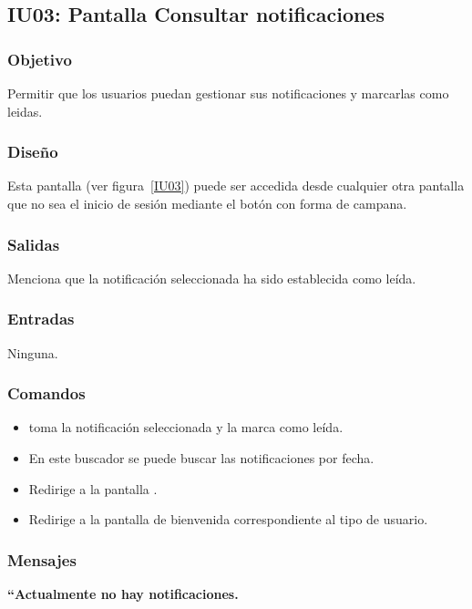 
\subsection{IU03: Pantalla Consultar notificaciones}

\subsubsection{Objetivo}
Permitir que los usuarios puedan gestionar sus notificaciones y marcarlas como leidas.
\subsubsection{Diseño}
    Esta pantalla  (ver figura~\ref{IU03}) puede ser accedida desde cualquier otra pantalla que no sea el inicio de sesión mediante el botón con forma de campana.

\subsubsection{Salidas}
Menciona que la notificación seleccionada ha sido establecida como leída.
\subsubsection{Entradas}
   Ninguna.

\subsubsection{Comandos}
\begin{itemize}
    \item {} toma la notificación seleccionada y la marca como leída.
    \item {} En este buscador se puede buscar las notificaciones por fecha.
    \item {} Redirige a la pantalla .
    \item {} Redirige a la pantalla de bienvenida correspondiente al tipo de usuario.
\end{itemize}

\subsubsection{Mensajes}
     
\begin{Citemize}
    \item {\bf``Actualmente no hay notificaciones.}
\end{Citemize}


